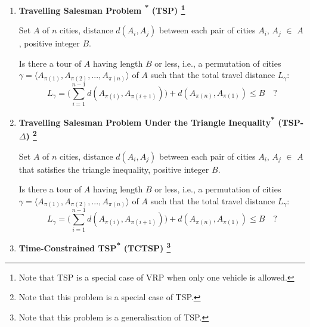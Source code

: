 \documentclass{mprop}
\theoremstyle{definition}
\begin{document}
\begin{enumerate}


\item \textbf{Travelling Salesman Problem \textsuperscript{*} (TSP) \footnote{Note that TSP is a special case of VRP when only one vehicle is allowed.}}
\begin{instance}
Set $A$ of $n$ cities, distance $d(A_{i}, A_{j})$ between each pair of cities $A_{i}$, $A_{j}$ $\in$ $A$, positive integer $B$.
\end{instance}

\begin{question}
Is there a tour of $A$ having length $B$ or less, i.e., a permutation of cities $\gamma = \langle A_{\pi(1)}, A_{\pi(2)},...,A_{\pi(n)} \rangle $ of $A$ such that the total travel distance $L_{\gamma}$:
$$L_{\gamma} = \bigg( \sum_{i=1}^{n-1} d(A_{\pi(i)}, A_{\pi(i+1)}) \bigg) + d(A_{\pi(n)}, A_{\pi(1)}) \leq B \quad \textrm{?}$$
\end{question}

\item \textbf{Travelling Salesman Problem Under the Triangle Inequality\textsuperscript{*} (TSP-$\Delta$) \footnote{Note that this problem is a special case of TSP.}}
\begin{instance}
Set $A$ of $n$ cities, distance $d(A_{i}, A_{j})$ between each pair of cities $A_{i}$, $A_{j}$ $\in$ $A$ that satisfies the triangle inequality, positive integer $B$.
\end{instance}

\begin{question}
Is there a tour of $A$ having length $B$ or less, i.e., a permutation of cities $\gamma = \langle A_{\pi(1)}, A_{\pi(2)},...,A_{\pi(n)} \rangle $ of $A$ such that the total travel distance $L_{\gamma}$:
$$L_{\gamma} = \bigg( \sum_{i=1}^{n-1} d(A_{\pi(i)}, A_{\pi(i+1)}) \bigg) + d(A_{\pi(n)}, A_{\pi(1)}) \leq B \quad \textrm{?}$$
\end{question}

\item \textbf{Time-Constrained TSP\textsuperscript{*} (TCTSP) \footnote{Note that this problem is a generalisation of TSP.}}


\end{enumerate}
\end{document}
